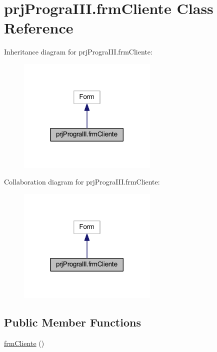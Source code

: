 \hypertarget{classprj_progra_i_i_i_1_1frm_cliente}{}\section{prj\+Progra\+I\+I\+I.\+frm\+Cliente Class Reference}
\label{classprj_progra_i_i_i_1_1frm_cliente}


Inheritance diagram for prj\+Progra\+I\+I\+I.\+frm\+Cliente\+:
\nopagebreak
\begin{figure}[H]
\begin{center}
\leavevmode
\includegraphics[width=189pt]{classprj_progra_i_i_i_1_1frm_cliente__inherit__graph}
\end{center}
\end{figure}


Collaboration diagram for prj\+Progra\+I\+I\+I.\+frm\+Cliente\+:
\nopagebreak
\begin{figure}[H]
\begin{center}
\leavevmode
\includegraphics[width=189pt]{classprj_progra_i_i_i_1_1frm_cliente__coll__graph}
\end{center}
\end{figure}
\subsection*{Public Member Functions}
\begin{DoxyCompactItemize}
\item 
\hyperlink{classprj_progra_i_i_i_1_1frm_cliente_aba05e78333e17b49180377bbcb2f358f}{frm\+Cliente} ()
\end{DoxyCompactItemize}
